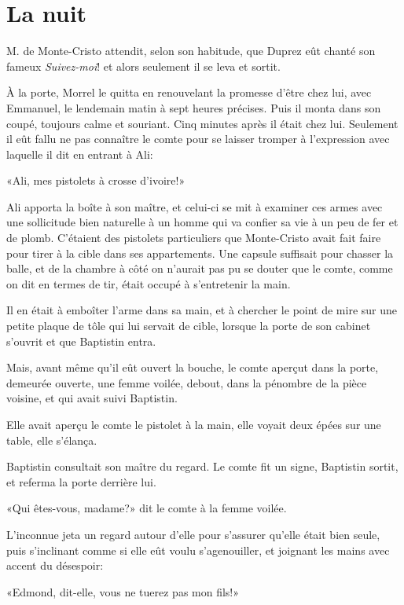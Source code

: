 \chapter{La nuit} 

\lettrine{M}{.} de Monte-Cristo attendit, selon son habitude, que Duprez eût chanté son fameux \textit{Suivez-moi}! et alors seulement il se leva et sortit. 

\zz
À la porte, Morrel le quitta en renouvelant la promesse d'être chez lui, avec Emmanuel, le lendemain matin à sept heures précises. Puis il monta dans son coupé, toujours calme et souriant. Cinq minutes après il était chez lui. Seulement il eût fallu ne pas connaître le comte pour se laisser tromper à l'expression avec laquelle il dit en entrant à Ali: 

«Ali, mes pistolets à crosse d'ivoire!» 

Ali apporta la boîte à son maître, et celui-ci se mit à examiner ces armes avec une sollicitude bien naturelle à un homme qui va confier sa vie à un peu de fer et de plomb. C'étaient des pistolets particuliers que Monte-Cristo avait fait faire pour tirer à la cible dans ses appartements. Une capsule suffisait pour chasser la balle, et de la chambre à côté on n'aurait pas pu se douter que le comte, comme on dit en termes de tir, était occupé à s'entretenir la main. 

Il en était à emboîter l'arme dans sa main, et à chercher le point de mire sur une petite plaque de tôle qui lui servait de cible, lorsque la porte de son cabinet s'ouvrit et que Baptistin entra. 

Mais, avant même qu'il eût ouvert la bouche, le comte aperçut dans la porte, demeurée ouverte, une femme voilée, debout, dans la pénombre de la pièce voisine, et qui avait suivi Baptistin. 

Elle avait aperçu le comte le pistolet à la main, elle voyait deux épées sur une table, elle s'élança. 

Baptistin consultait son maître du regard. Le comte fit un signe, Baptistin sortit, et referma la porte derrière lui. 

«Qui êtes-vous, madame?» dit le comte à la femme voilée. 

L'inconnue jeta un regard autour d'elle pour s'assurer qu'elle était bien seule, puis s'inclinant comme si elle eût voulu s'agenouiller, et joignant les mains avec accent du désespoir: 

«Edmond, dit-elle, vous ne tuerez pas mon fils!» 

